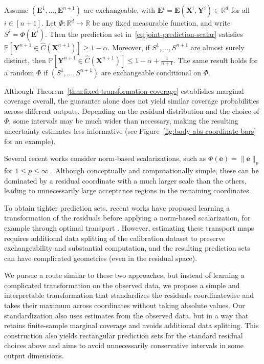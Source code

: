 \begin{theorem}
\label{thm:fixed-transformation-coverage}
Assume $(\mathbf E^1,\ldots,\mathbf E^{n+1})$ are exchangeable, with $\mathbf E^i=\mathbf E(\mathbf X^i,\mathbf Y^i)\in\mathbb R^d$ for all $i\in[n+1]$.
Let $\Phi:\mathbb R^d\to\mathbb R$ be any fixed measurable function, and write $S^i=\Phi(\mathbf E^i)$.
Then the prediction set in~\eqref{eq:joint-prediction-scalar} satisfies
$\mathbb P\!\left[
\mathbf Y^{n+1}\in\hat C(\mathbf X^{n+1})
\right]\geq1-\alpha.$
Moreover, if $S^1,\ldots,S^{n+1}$ are almost surely distinct, then
$\mathbb P\!\left[
\mathbf Y^{n+1}\in\hat C(\mathbf X^{n+1})
\right]\leq1-\alpha+\frac1{n+1}.$
The same result holds for a random $\Phi$ if $(S^1,\ldots,S^{n+1})$ are exchangeable conditional on $\Phi$.
\end{theorem}

Although Theorem~\ref{thm:fixed-transformation-coverage} establishes marginal coverage overall, the guarantee alone does not yield similar coverage probabilities across different outputs.
Depending on the residual distribution and the choice of $\Phi$, some intervals may be much wider than necessary, making the resulting uncertainty estimates less informative (see Figure~\ref{fig:body-abs-coordinate-bars} for an example).

Several recent works consider norm-based scalarizations, such as $\Phi(\mathbf e)=\|\mathbf e\|_p$ for $1\leq p\leq\infty$ \citep{johnstone2022exact}.
Although conceptually and computationally simple, these can be dominated by a residual coordinate with a much larger scale than the others, leading to unnecessarily large acceptance regions in the remaining coordinates.

To obtain tighter prediction sets, recent works have proposed learning a transformation of the residuals before applying a norm-based scalarization, for example through optimal transport \citep{thurin2025otcp,klein2025multivariate}.
However, estimating these transport maps requires additional data splitting of the calibration dataset to preserve exchangeability and substantial computation, and the resulting prediction sets can have complicated geometries (even in the residual space).

We pursue a route similar to these two approaches, but
instead of learning a complicated transformation on the observed data, we propose a simple and interpretable transformation that standardizes the residuals coordinatewise and takes their maximum across coordinates without taking absolute values. Our standardization also uses estimates from the observed data, but in a way that retains finite-sample marginal coverage and avoids additional data splitting.
This construction also yields rectangular prediction sets for the standard residual choices above and aims to avoid unnecessarily conservative intervals in some output dimensions.


